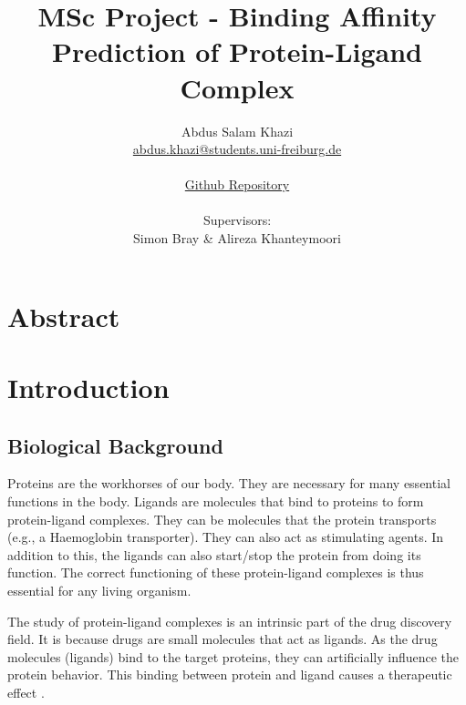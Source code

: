 \documentclass[11pt]{article}
\title{MSc Project - Binding Affinity Prediction of Protein-Ligand Complex}
\author{
        Abdus Salam Khazi\\
        \href{mailto:abdus.khazi@students.uni-freiburg.de}
                {abdus.khazi@students.uni-freiburg.de}\\ \\
        \href{https://github.com/abduskhazi/MSc-Project}
                {Github Repository} \cite{github_repository} \\ \\
        Supervisors:
        \begin{tabular}{ll}
			Simon Bray \&
			Alireza Khanteymoori
		\end{tabular}
       }
\begin{document}
\maketitle
\date{}
\tableofcontents
\newpage

\section{Abstract}
\newpage

\section{Introduction}

\subsection{Biological Background}
Proteins are the workhorses of our body.  They are necessary for many essential functions in the body.  Ligands are molecules that bind to proteins to form protein-ligand complexes.  They can be molecules that the protein transports (e.g., a Haemoglobin transporter). They can also act as stimulating agents.  In addition to this, the ligands can also start/stop the protein from doing its function. The correct functioning of these protein-ligand complexes is thus essential for any living organism.

The study of protein-ligand complexes is an intrinsic part of the drug discovery field. It is because drugs are small molecules that act as ligands. As the drug molecules (ligands) bind to the target proteins, they can artificially influence the protein behavior. This binding between protein and ligand causes a therapeutic effect
\cite{proteinlingandbindingpaper}.
\end{document}
